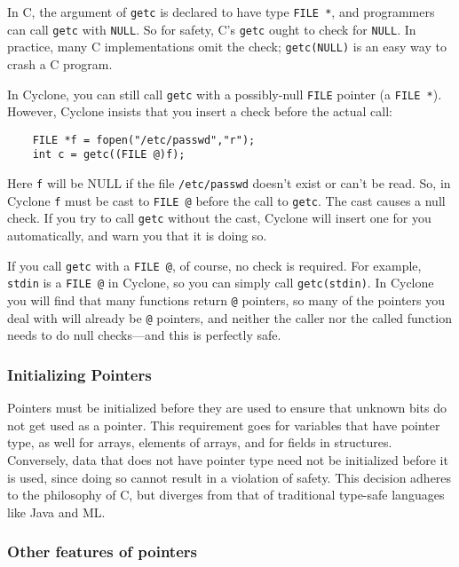 In C, the argument of \texttt{getc} is declared to have type
\texttt{FILE *}, and programmers can call \texttt{getc} with
\texttt{NULL}\@.  So for safety, C's \texttt{getc} ought to check for
\texttt{NULL}\@.  In practice, many C implementations omit the check;
\texttt{getc(NULL)} is an easy way to crash a C program.

In Cyclone, you can still call \texttt{getc} with a possibly-null
\texttt{FILE} pointer (a \texttt{FILE *}).  However, Cyclone insists
that you insert a check before the actual call:
\begin{verbatim}
    FILE *f = fopen("/etc/passwd","r");
    int c = getc((FILE @)f);
\end{verbatim}
Here \texttt{f} will be NULL if the file \texttt{/etc/passwd} doesn't
exist or can't be read.  So, in Cyclone \texttt{f} must be cast to
\texttt{FILE @} before the call to \texttt{getc}.  The cast causes a
null check.  If you try to call \texttt{getc} without the cast,
Cyclone will insert one for you automatically, and warn you that it is
doing so.

If you call \texttt{getc} with a \texttt{FILE @}, of course, no check
is required.  For example, \texttt{stdin} is a \texttt{FILE @} in
Cyclone, so you can simply call \texttt{getc(stdin)}.  In Cyclone you
will find that many functions return \texttt{@} pointers, so many of
the pointers you deal with will already be \texttt{@} pointers, and
neither the caller nor the called function needs to do null
checks---and this is perfectly safe.

\subsubsection*{Initializing Pointers}

Pointers must be initialized before they are used to ensure that unknown
bits do not get used as a pointer.  This requirement goes for
variables that have pointer type, as well for arrays, elements of arrays,
and for fields in structures.  Conversely, data that does not have pointer
type need not be initialized before it is used, since doing so cannot result
in a violation of safety.  This decision adheres to the philosophy of C, but
diverges from that of traditional type-safe languages like Java and ML.

\subsubsection*{Other features of pointers}

